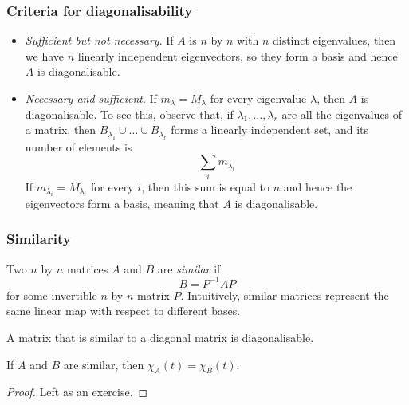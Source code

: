 \documentclass{../template/note}
\begin{document}
    \subsubsection{Criteria for diagonalisability}

    \begin{itemize}
        \item \emph{Sufficient but not necessary}. If \(A\) is \(n\) by \(n\) with \(n\) distinct eigenvalues, then we have \(n\) linearly independent eigenvectors, so they form a basis and hence \(A\) is diagonalisable.
        \item \emph{Necessary and sufficient}. If \(m_\lambda = M_\lambda\) for every eigenvalue \(\lambda\), then \(A\) is diagonalisable. To see this, observe that, if \(\lambda_1, \dots, \lambda_r\) are all the eigenvalues of a matrix, then \(B_{\lambda_1} \cup \dots \cup B_{\lambda_r}\) forms a linearly independent set, and its number of elements is
        \[
            \sum_{i} m_{\lambda_i}
        \]
        If \(m_{\lambda_i} = M_{\lambda_i}\) for every \(i\), then this sum is equal to \(n\) and hence the eigenvectors form a basis, meaning that \(A\) is diagonalisable.
    \end{itemize}
    
    \subsubsection{Similarity}

    \begin{definition}
        Two \(n\) by \(n\) matrices \(A\) and \(B\) are \emph{similar} if
        \[
            B = P^{-1}AP
        \]
        for some invertible \(n\) by \(n\) matrix \(P\). Intuitively, similar matrices represent the same linear map with respect to different bases.
    \end{definition}

    \begin{remark}
        A matrix that is similar to a diagonal matrix is diagonalisable.
    \end{remark}
    
    \begin{proposition}
        If \(A\) and \(B\) are similar, then \(\chi_A(t) = \chi_B(t)\). 
    \end{proposition}

    \begin{proof}
        Left as an exercise.
    \end{proof}
    
\end{document}
